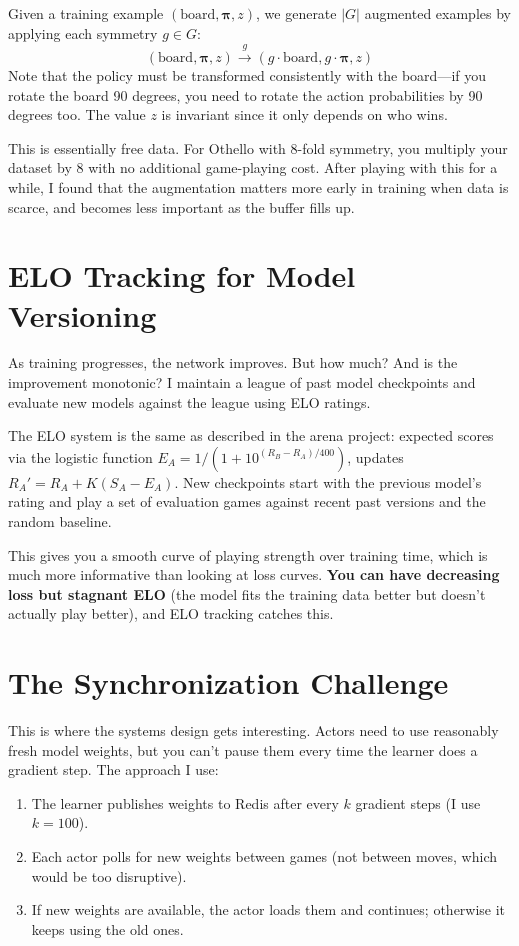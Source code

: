 \documentclass[11pt]{article}
\begin{document}
Given a training example $(\text{board}, \boldsymbol{\pi}, z)$, we generate $|G|$ augmented examples by applying each symmetry $g \in G$:
\[
(\text{board}, \boldsymbol{\pi}, z) \xrightarrow{g} (g \cdot \text{board}, g \cdot \boldsymbol{\pi}, z)
\]
Note that the policy must be transformed consistently with the board---if you rotate the board 90 degrees, you need to rotate the action probabilities by 90 degrees too. The value $z$ is invariant since it only depends on who wins.

This is essentially free data. For Othello with 8-fold symmetry, you multiply your dataset by 8 with no additional game-playing cost. After playing with this for a while, I found that the augmentation matters more early in training when data is scarce, and becomes less important as the buffer fills up.

\section{ELO Tracking for Model Versioning}

As training progresses, the network improves. But how much? And is the improvement monotonic? I maintain a league of past model checkpoints and evaluate new models against the league using ELO ratings.

The ELO system is the same as described in the arena project: expected scores via the logistic function $E_A = 1/(1 + 10^{(R_B - R_A)/400})$, updates $R_A' = R_A + K(S_A - E_A)$. New checkpoints start with the previous model's rating and play a set of evaluation games against recent past versions and the random baseline.

This gives you a smooth curve of playing strength over training time, which is much more informative than looking at loss curves. \textbf{You can have decreasing loss but stagnant ELO} (the model fits the training data better but doesn't actually play better), and ELO tracking catches this.

\section{The Synchronization Challenge}

This is where the systems design gets interesting. Actors need to use reasonably fresh model weights, but you can't pause them every time the learner does a gradient step. The approach I use:

\begin{enumerate}
\item The learner publishes weights to Redis after every $k$ gradient steps (I use $k=100$).
\item Each actor polls for new weights between games (not between moves, which would be too disruptive).
\item If new weights are available, the actor loads them and continues; otherwise it keeps using the old ones.
\end{enumerate}
\end{document}
